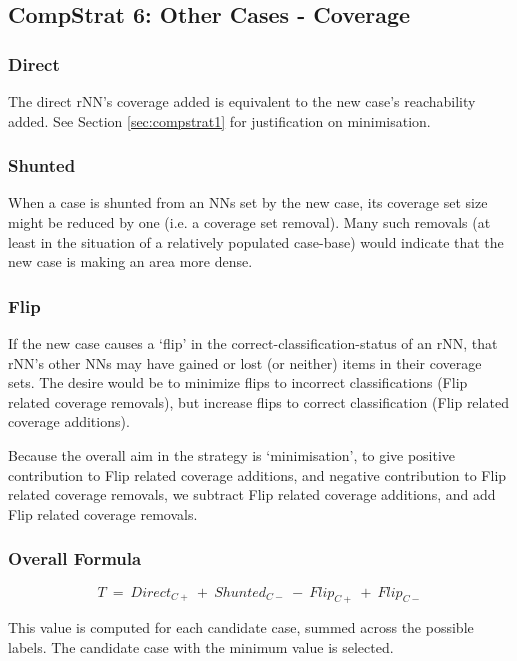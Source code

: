 \documentclass[a4paper,11pt]{report}
\begin{document}
\subsection{CompStrat 6: Other Cases - Coverage}

\subsubsection{Direct}

The direct rNN's coverage added is equivalent to the new case's reachability added. See Section \ref{sec:compstrat1} for justification on minimisation.

\subsubsection{Shunted}

When a case is shunted from an NNs set by the new case, its coverage set size might be reduced by one (i.e. a coverage set removal). Many such removals (at least in the situation of a relatively populated case-base) would indicate that the new case is making an area more dense.

\subsubsection{Flip}

If the new case causes a `flip' in the correct-classification-status of an rNN, that rNN's other NNs may have gained or lost (or neither) items in their coverage sets. The desire would be to minimize flips to incorrect classifications (Flip related coverage removals), but increase flips to correct classification (Flip related coverage additions).

Because the overall aim in the strategy is `minimisation', to give positive contribution to Flip related coverage additions, and negative contribution to Flip related coverage removals, we subtract Flip related coverage additions, and add Flip related coverage removals.

\subsubsection{Overall Formula}
\[  
  T~=~Direct_{C+}~+~Shunted_{C-}~-~Flip_{C+}~+~Flip_{C-}
\]

This value is computed for each candidate case, summed across the possible labels. The candidate case with the minimum value is selected.
\end{document}
